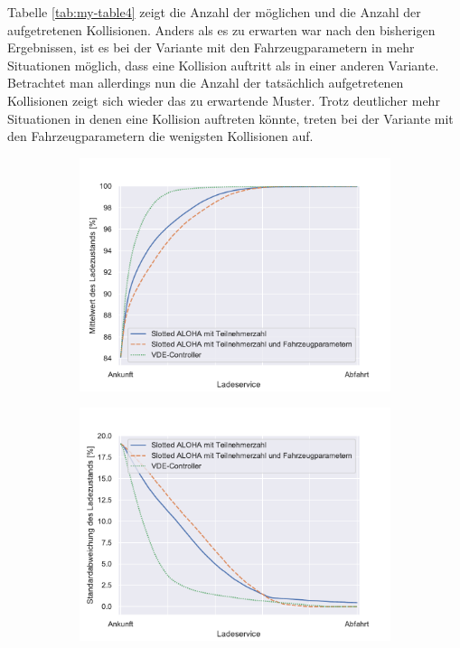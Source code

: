 Tabelle \ref{tab:my-table4} zeigt die Anzahl der möglichen und die Anzahl der aufgetretenen Kollisionen. Anders als es zu erwarten war nach den bisherigen Ergebnissen, ist es bei der Variante mit den Fahrzeugparametern in mehr Situationen möglich, dass eine Kollision auftritt als in einer anderen Variante. Betrachtet man allerdings nun die Anzahl der tatsächlich aufgetretenen Kollisionen zeigt sich wieder das zu erwartende Muster. Trotz deutlicher mehr Situationen in denen eine Kollision auftreten könnte, treten bei der Variante mit den Fahrzeugparametern die wenigsten Kollisionen auf.
\begin{figure}
	\begin{subfigure}{0.49\linewidth}
		\includegraphics[width=\linewidth]{img/mitTrafo/SlottedAloha_participants_VDE_tau_trafo_15_soc_mean.pdf}
        \label{ABB_mt_SocMEAN}
	\end{subfigure}
	\begin{subfigure}{0.49\linewidth}
		\includegraphics[width=\linewidth]{img/mitTrafo/SlottedAloha_participants_VDE_tau_trafo_15_soc_std.pdf}
        \label{ABB_mT_SocSTD}
	\end{subfigure}
\end{figure}
